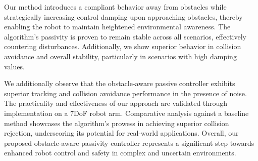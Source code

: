 Our method introduces a compliant behavior away from obstacles while strategically increasing control damping upon approaching obstacles, thereby enabling the robot to maintain heightened environmental awareness. The algorithm's passivity is proven to remain stable across all scenarios, effectively countering disturbances. Additionally, we show superior behavior in collision avoidance and overall stability, particularly in scenarios with high damping values. 

We additionally observe that the obstacle-aware passive controller exhibits superior tracking and collision avoidance performance in the presence of noise.
The practicality and effectiveness of our approach are validated through implementation on a 7DoF robot arm. Comparative analysis against a baseline method showcases the algorithm's prowess in achieving superior collision rejection, underscoring its potential for real-world applications. Overall, our proposed obstacle-aware passivity controller represents a significant step towards enhanced robot control and safety in complex and uncertain environments.




% 












